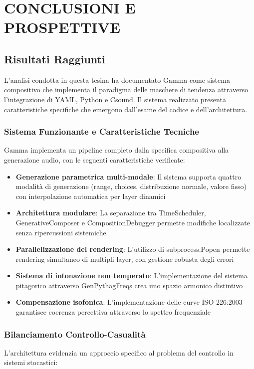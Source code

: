 
\section{CONCLUSIONI E PROSPETTIVE}
\subsection{Risultati Raggiunti}
L'analisi condotta in questa tesina ha documentato Gamma come sistema compositivo che implementa il paradigma delle maschere di tendenza attraverso l'integrazione di YAML, Python e Csound. Il sistema realizzato presenta caratteristiche specifiche che emergono dall'esame del codice e dell'architettura.
\subsubsection{Sistema Funzionante e Caratteristiche Tecniche}
Gamma implementa un pipeline completo dalla specifica compositiva alla generazione audio, con le seguenti caratteristiche verificate:

\begin{itemize}
    \item \textbf{Generazione parametrica multi-modale}: Il sistema supporta quattro modalità di generazione (range, choices, distribuzione normale, valore fisso) con interpolazione automatica per layer dinamici
    \item \textbf{Architettura modulare}: La separazione tra TimeScheduler, GenerativeComposer e CompositionDebugger permette modifiche localizzate senza ripercussioni sistemiche
    \item \textbf{Parallelizzazione del rendering}: L'utilizzo di subprocess.Popen permette rendering simultaneo di multipli layer, con gestione robusta degli errori
    \item \textbf{Sistema di intonazione non temperato}: L'implementazione del sistema pitagorico attraverso GenPythagFreqs crea uno spazio armonico distintivo
    \item \textbf{Compensazione isofonica}: L'implementazione delle curve ISO 226:2003 garantisce coerenza percettiva attraverso lo spettro frequenziale
\end{itemize}
\subsubsection{Bilanciamento Controllo-Casualità}
L'architettura evidenzia un approccio specifico al problema del controllo in sistemi stocastici:

